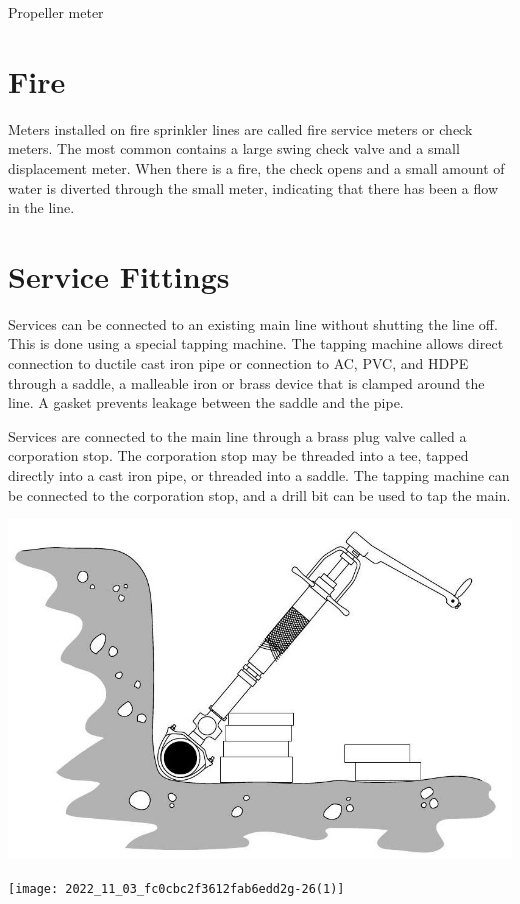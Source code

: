 \documentclass[10pt]{article}
\begin{document}
Propeller meter

\section{Fire}
Meters installed on fire sprinkler lines are called fire service meters or check meters. The most common contains a large swing check valve and a small displacement meter. When there is a fire, the check opens and a small amount of water is diverted through the small meter, indicating that there has been a flow in the line.

\section{Service Fittings}
Services can be connected to an existing main line without shutting the line off. This is done using a special tapping machine. The tapping machine allows direct connection to ductile cast iron pipe or connection to AC, PVC, and HDPE through a saddle, a malleable iron or brass device that is clamped around the line. A gasket prevents leakage between the saddle and the pipe.

Services are connected to the main line through a brass plug valve called a corporation stop. The corporation stop may be threaded into a tee, tapped directly into a cast iron pipe, or threaded into a saddle. The tapping machine can be connected to the corporation stop, and a drill bit can be used to tap the main.

\includegraphics[max width=\textwidth]{2022_11_03_fc0cbc2f3612fab6edd2g-26}

\texttt{[image: 2022\_11\_03\_fc0cbc2f3612fab6edd2g-26(1)]}
\end{document}
